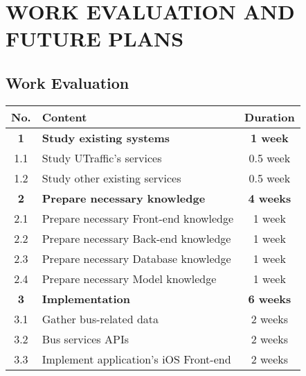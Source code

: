 \section{WORK EVALUATION AND FUTURE PLANS}

\subsection{Work Evaluation}

\begin{table}[H]
    \centering
    \begin{tabularx}{\textwidth}{| c | X | c |}
        \hline
        No.         &       \centering Content                          & Duration              \\ \hline
        \textbf{1}  & \centering \textbf{Study existing systems}        & \textbf{1 week}       \\ \hline
        1.1         & Study UTraffic's services                         & 0.5 week              \\ \hline
        1.2         & Study other existing services                     & 0.5 week              \\ \hline
        \textbf{2}  & \centering \textbf{Prepare necessary knowledge}   & \textbf{4 weeks}      \\ \hline
        2.1         & Prepare necessary Front-end knowledge             & 1 week                \\ \hline
        2.2         & Prepare necessary Back-end knowledge              & 1 week                \\ \hline
        2.3         & Prepare necessary Database knowledge              & 1 week                \\ \hline
        2.4         & Prepare necessary Model knowledge                 & 1 week                \\ \hline
        \textbf{3}  & \centering \textbf{Implementation}                & \textbf{6 weeks}      \\ \hline
        3.1         & Gather bus-related data                           & 2 weeks               \\ \hline
        3.2         & Bus services APIs                                 & 2 weeks               \\ \hline
        3.3         & Implement application's iOS Front-end             & 2 weeks               \\ \hline
    \end{tabularx}
\end{table}

